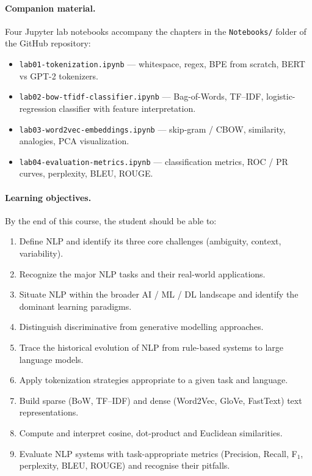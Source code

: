 \documentclass[12pt,a4paper,openright]{report}
\theoremstyle{definition}
\theoremstyle{remark}
\begin{document}
\paragraph{Companion material.} Four Jupyter lab notebooks accompany the chapters in the \texttt{Notebooks/} folder of the GitHub repository:
\begin{itemize}
    \item \texttt{lab01-tokenization.ipynb} --- whitespace, regex, BPE from scratch, BERT vs GPT-2 tokenizers.
    \item \texttt{lab02-bow-tfidf-classifier.ipynb} --- Bag-of-Words, TF--IDF, logistic-regression classifier with feature interpretation.
    \item \texttt{lab03-word2vec-embeddings.ipynb} --- skip-gram / CBOW, similarity, analogies, PCA visualization.
    \item \texttt{lab04-evaluation-metrics.ipynb} --- classification metrics, ROC / PR curves, perplexity, BLEU, ROUGE.
\end{itemize}

\paragraph{Learning objectives.} By the end of this course, the student should be able to:
\begin{enumerate}
    \item Define NLP and identify its three core challenges (ambiguity, context, variability).
    \item Recognize the major NLP tasks and their real-world applications.
    \item Situate NLP within the broader AI / ML / DL landscape and identify the dominant learning paradigms.
    \item Distinguish discriminative from generative modelling approaches.
    \item Trace the historical evolution of NLP from rule-based systems to large language models.
    \item Apply tokenization strategies appropriate to a given task and language.
    \item Build sparse (BoW, TF--IDF) and dense (Word2Vec, GloVe, FastText) text representations.
    \item Compute and interpret cosine, dot-product and Euclidean similarities.
    \item Evaluate NLP systems with task-appropriate metrics (Precision, Recall, F$_1$, perplexity, BLEU, ROUGE) and recognise their pitfalls.
\end{enumerate}

\tableofcontents



\end{document}
